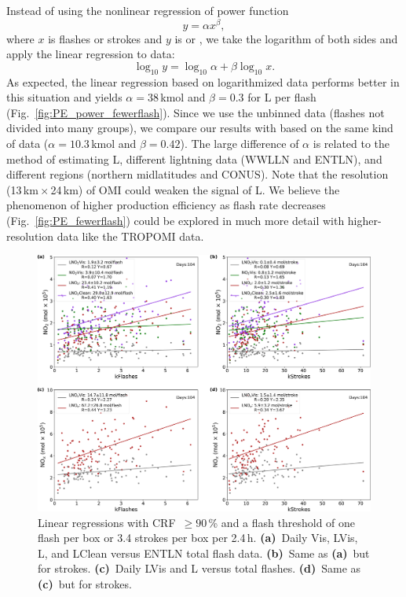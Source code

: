 \documentclass[amt]{copernicus}
\begin{document}
Instead of using the nonlinear regression of power function
  \begin{equation} \label{power_function}
    y = \alpha x^{\beta},
  \end{equation}
  where $x$ is flashes or strokes and $y$ is  or ,
  we take the logarithm of both sides and apply the linear regression to data:
  \begin{equation} \label{logarithm}
    \log_{10}y = \log_{10}{\alpha} + \beta \log_{10}{x}.
  \end{equation}
As expected, the linear regression based on logarithmized data performs better in this situation and yields $\alpha = 38$\,kmol and $\beta = 0.3$ for L per flash (Fig.~\ref{fig:PE_power_fewerflash}).
Since we use the unbinned data (flashes not divided into many groups), we compare our results with \citet{Bucsela.2019} based on the same kind of data ($\alpha = 10.3$\,kmol and $\beta = 0.42$).
The large difference of $\alpha$ is related to the method of estimating L, different lightning data (WWLLN and ENTLN), and different regions (northern midlatitudes and CONUS).
Note that the resolution (13\,km\,$\times$\,24\,km) of OMI could weaken the signal of L.
We believe the phenomenon of higher production efficiency as flash rate decreases (Fig.~\ref{fig:PE_fewerflash}) could be explored in much more detail with higher-resolution data like the TROPOMI data.

\begin{figure}[p]
    \includegraphics[width=15cm]{amt-2019-372-f13.png}
    \caption{Linear regressions with CRF~$\geq 90$\,{\%} and a flash threshold of one flash per box or 3.4 strokes per box per 2.4\,h.
  \textbf{(a)}~Daily Vis, LVis, L, and LClean versus ENTLN total flash data.
  \textbf{(b)}~Same as \textbf{(a)}~but for strokes.
  \textbf{(c)}~Daily LVis and L versus total flashes.
  \textbf{(d)}~Same as \textbf{(c)}~but for strokes.}
    \label{fig:PE_linear_fewerflash}
\end{figure}
\end{document}
